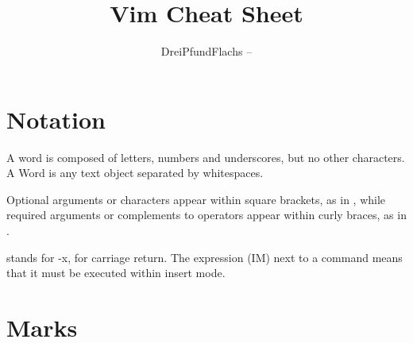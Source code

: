 \documentclass[a4paper,10pt]{amsart}
\begin{document}
\pagestyle{empty}
\title[]{Vim Cheat Sheet}
\author{DreiPfundFlachs -- 
\href{https://github.com/dreipfundflachs}{}}
\maketitle




\section{Notation}\label{S:notation}
\thispagestyle{empty}


A word is composed of letters, numbers and underscores, but no other characters.
A Word is any text object separated by whitespaces. 

Optional arguments or
characters appear within square brackets, as in , while required
arguments or complements to operators appear within curly braces, as in
.

 stands for -x,  for carriage return. The
expression (IM) next to a command means that it must be executed within
insert mode. 



\section{Marks}\label{S:marks}
\end{document}
